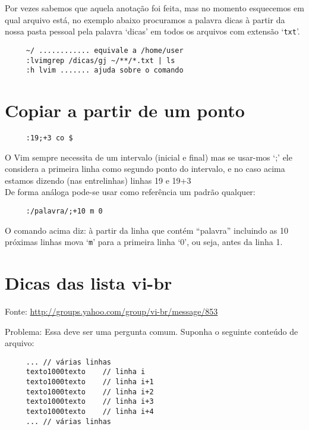 Por vezes sabemos que aquela anotação foi feita, mas no momento esquecemos em qual
arquivo está, no exemplo abaixo procuramos a palavra dicas à partir da nossa pasta pessoal
pela palavra `dicas' em todos os arquivos com extensão `{\tt txt}'.

\begin{verbatim}
     ~/ ............ equivale a /home/user
     :lvimgrep /dicas/gj ~/**/*.txt | ls
     :h lvim ....... ajuda sobre o comando
\end{verbatim}



\section{Copiar a partir de um ponto}

\begin{verbatim}
     :19;+3 co $
\end{verbatim}

O Vim sempre necessita de um intervalo (inicial e final) mas se usar-mos
`;' ele considera a primeira linha como segundo ponto do
intervalo, e no caso acima estamos dizendo (nas entrelinhas) linhas
19 e 19+3     \\


De forma análoga pode-se usar como referência um padrão qualquer:

\begin{verbatim}
     :/palavra/;+10 m 0
\end{verbatim}

O comando acima diz: à partir da linha que contém ``palavra'' incluindo as 10 próximas linhas
mova `{\tt m}' para a primeira linha `0', ou seja, antes da linha 1.

\section{Dicas das lista vi-br}

Fonte: \url{http://groups.yahoo.com/group/vi-br/message/853}

Problema:
Essa deve ser uma pergunta comum.
Suponha o seguinte conteúdo de arquivo:

\begin{verbatim}
     ... // várias linhas
     texto1000texto    // linha i
     texto1000texto    // linha i+1
     texto1000texto    // linha i+2
     texto1000texto    // linha i+3
     texto1000texto    // linha i+4
     ... // várias linhas
\end{verbatim}

